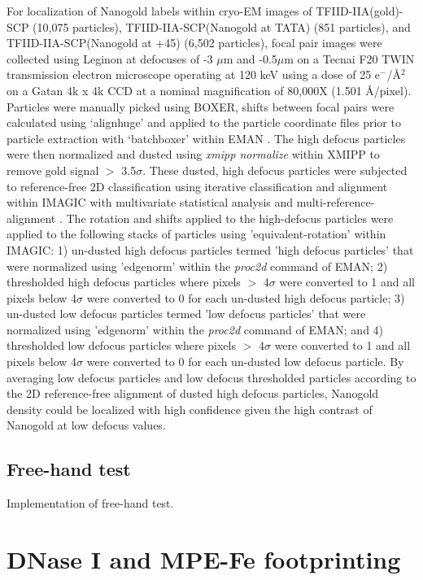 For localization of Nanogold labels within cryo-EM images of TFIID-IIA(gold)-SCP (10,075 particles), TFIID-IIA-SCP(Nanogold at TATA) (851 particles), and TFIID-IIA-SCP(Nanogold at +45) (6,502 particles), focal pair images were collected using Leginon \cite{Suloway_1311} at defocuses of -3 $\mu$m and -0.5$\mu$m on a Tecnai F20 TWIN transmission electron microscope operating at 120 keV using a dose of 25 e$^{-}$/\AA$^{2}$ on a Gatan 4k x 4k CCD at a nominal magnification of 80,000X (1.501 \AA/pixel).  Particles were manually picked using BOXER, shifts between focal pairs were calculated using ‘alignhuge’ and applied to the particle coordinate files prior to particle extraction with ‘batchboxer’ within EMAN \cite{Ludtke_2307}.  The high defocus particles were then normalized and dusted using \emph{xmipp normalize} within XMIPP \cite{Sorzano_1492} to remove gold signal $>$ 3.5$\sigma$. These dusted, high defocus particles were subjected to reference-free 2D classification using iterative classification and alignment within IMAGIC with multivariate statistical analysis and multi-reference-alignment \cite{va_2849}. The rotation and shifts applied to the high-defocus particles were applied to the following stacks of particles using 'equivalent-rotation' within IMAGIC:  1) un-dusted high defocus particles termed 'high defocus particles' that were normalized using 'edgenorm' within the \emph{proc2d} command of EMAN; 2) thresholded high defocus particles where pixels $>$ 4$\sigma$ were converted to 1 and all pixels below 4$\sigma$ were converted to 0 for each un-dusted high defocus particle; 3) un-dusted low defocus particles termed 'low defocus particles' that were normalized using 'edgenorm' within the \emph{proc2d} command of EMAN; and 4) thresholded low defocus particles where pixels $>$ 4$\sigma$ were converted to 1 and all pixels below 4$\sigma$ were converted to 0 for each un-dusted low defocus particle.  By averaging low defocus particles and low defocus thresholded particles according to the 2D reference-free alignment of dusted high defocus particles, Nanogold density could be localized with high confidence given the high contrast of Nanogold at low defocus values.

\subsection{Free-hand test}

Implementation of free-hand test.

\section{DNase I and MPE-Fe footprinting}

